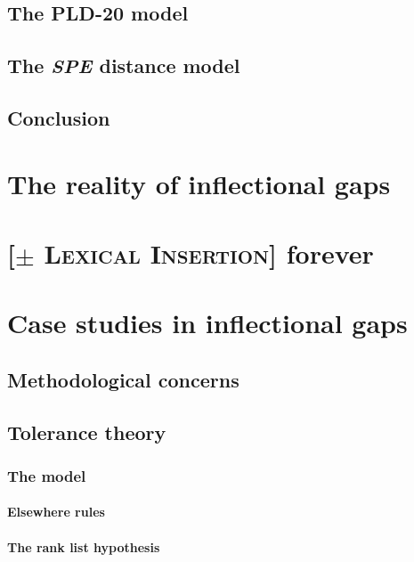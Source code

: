 \documentclass{upenndiss}
\begin{document}
\section{The PLD-20 model}

\section{The \emph{SPE} distance model}

\section{Conclusion}

\chapter{The reality of inflectional gaps}
\lipsum

\chapter{[$\pm$ \textsc{Lexical Insertion}] forever}

\chapter{Case studies in inflectional gaps}
\lipsum

\section{Methodological concerns}

\section{Tolerance theory}

\subsection{The model}

\subsubsection{Elsewhere rules}

\subsubsection{The rank list hypothesis}
\end{document}
